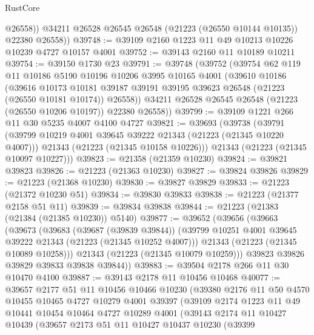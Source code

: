 \begin{lexlean}{RustCore}
\begin{coremodule}
            @26558))
        @34211
        @26528
        @26545
        @26548
        (@21223 (@26550 @10144 @10135))
        @22380
        @26558))
@39748 := @39109 @2160 @1223 @11 @49 @10213 @10226 @10239 @4727 @10157 @4001
@39752 := @39143 @2160 @11 @10189 @10211
@39754 := @39150 @1730 @23
@39791 := @39748
    (@39752
      (@39754
        @62
        @119
        @11
        @10186
        @5190
        @10196
        @10206
        @3995
        @10165
        @4001
        (@39610
          @10186
          (@39616
            @10173
            @10181
            @39187
            @39191
            @39195
            @39623
            @26548
            (@21223 (@26550 @10181 @10174))
            @26558))
        @34211
        @26528
        @26545
        @26548
        (@21223 (@26550 @10206 @10197))
        @22380
        @26558))
@39799 := @39109 @1221 @266 @11 @30 @5235 @4007 @4100 @4727
@39821 := @39693
    (@39738
      (@39791
        (@39799 @10219 @4001 @39645 @39222 @21343 (@21223 (@21345 @10220 @4007)))
        @21343
        (@21223 (@21345 @10158 @10226)))
      @21343
      (@21223 (@21345 @10097 @10227)))
@39823 := @21358 (@21359 @10230)
@39824 := @39821 @39823
@39826 := @21223 (@21363 @10230)
@39827 := @39824 @39826
@39829 := @21223 (@21368 @10230)
@39830 := @39827 @39829
@39833 := @21223 (@21372 @10230 @51)
@39834 := @39830 @39833
@39838 := @21223 (@21377 @2158 @51 @11)
@39839 := @39834 @39838
@39844 := @21223 (@21383 (@21384 (@21385 @10230)) @5140)
@39877 := @39652
    (@39656
      (@39663
        (@39673
          (@39683
            (@39687 (@39839 @39844))
            (@39799 @10251 @4001 @39645 @39222 @21343 (@21223 (@21345 @10252 @4007)))
            @21343
            (@21223 (@21345 @10089 @10258)))
          @21343
          (@21223 (@21345 @10079 @10259)))
        @39823
        @39826
        @39829
        @39833
        @39838
        @39844))
@39883 := @39504 @2178 @266 @11 @30 @10470 @4100
@39887 := @39143 @2178 @11 @10456 @10468
@40077 := @39657
    @2177
    @51
    @11
    @10456
    @10466
    @10230
    (@39380
      @2176
      @11
      @50
      @4570
      @10455
      @10465
      @4727
      @10279
      @4001
      @39397
      (@39109
        @2174
        @1223
        @11
        @49
        @10441
        @10454
        @10464
        @4727
        @10289
        @4001
        (@39143
          @2174
          @11
          @10427
          @10439
          (@39657
            @2173
            @51
            @11
            @10427
            @10437
            @10230
            (@39399

\end{coremodule}
\end{lexlean}
